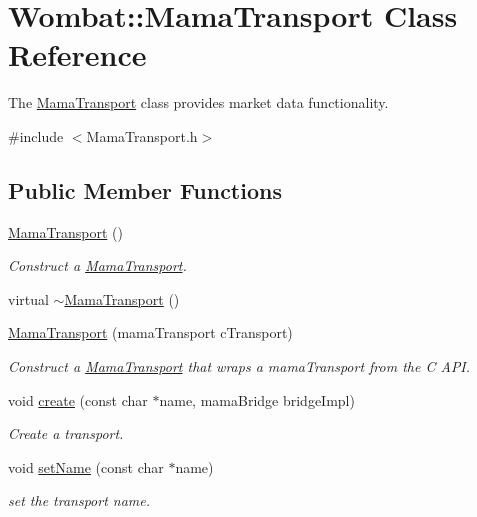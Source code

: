 \hypertarget{classWombat_1_1MamaTransport}{
\section{Wombat::MamaTransport Class Reference}
\label{classWombat_1_1MamaTransport}
}


The \hyperlink{classWombat_1_1MamaTransport}{MamaTransport} class provides market data functionality.  


{\ttfamily \#include $<$MamaTransport.h$>$}\subsection*{Public Member Functions}
\begin{DoxyCompactItemize}
\item 
\hyperlink{classWombat_1_1MamaTransport_abe9214f03456e224ad875c3fda215765}{MamaTransport} ()
\begin{DoxyCompactList}\small\item\em Construct a \hyperlink{classWombat_1_1MamaTransport}{MamaTransport}. \item\end{DoxyCompactList}\item 
virtual \hyperlink{classWombat_1_1MamaTransport_a10748e3b1de9fca5a0c0ded42aad48a7}{$\sim$MamaTransport} ()
\item 
\hyperlink{classWombat_1_1MamaTransport_a8512dc1364e6f2194c7b19c70572eda9}{MamaTransport} (mamaTransport cTransport)
\begin{DoxyCompactList}\small\item\em Construct a \hyperlink{classWombat_1_1MamaTransport}{MamaTransport} that wraps a mamaTransport from the C API. \item\end{DoxyCompactList}\item 
void \hyperlink{classWombat_1_1MamaTransport_ae3ceca31b7e534ab297442846dceb0c7}{create} (const char $\ast$name, mamaBridge bridgeImpl)
\begin{DoxyCompactList}\small\item\em Create a transport. \item\end{DoxyCompactList}\item 
void \hyperlink{classWombat_1_1MamaTransport_ad3a1c0fcd02fffd5bef6ab0cbdc3a749}{setName} (const char $\ast$name)
\begin{DoxyCompactList}\small\item\em set the transport name. \item\end{DoxyCompactList}\item 

\end{DoxyCompactItemize}
